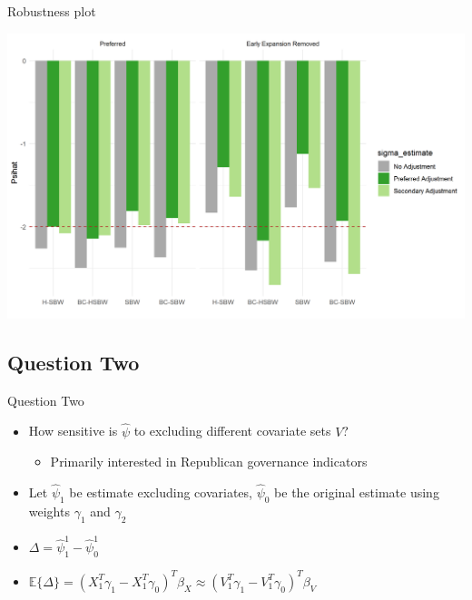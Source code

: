 \documentclass[hyperref={pdfpagelabels=false}]{beamer}
\begin{document}
\begin{frame}{Robustness plot}

\begin{center}
	\includegraphics[scale=0.5]{01_Plots/all-estimates-c1c2.png}
\end{center}
\end{frame}

\subsection{Question Two}

\begin{frame}{Question Two}
    \begin{itemize}
        \item How sensitive is $\hat{\psi}$ to excluding different covariate sets $V$? \bigskip 
        \begin{itemize}
            \item Primarily interested in Republican governance indicators \bigskip
        \end{itemize}
        \item Let $\hat{\psi}_1$ be estimate excluding covariates, $\hat{\psi}_0$ be the original estimate using weights $\gamma_1$ and $\gamma_2$ \bigskip
        \item $\Delta = \hat{\psi}^1_1 - \hat{\psi}^1_0$ \bigskip
        \item $\mathbb{E}\{\Delta\} = (X_1^T\gamma_1 - X_1^T\gamma_0)^T\beta_X \approx (V_1^T\gamma_1 - V_1^T\gamma_0)^T\beta_V$
    \end{itemize}
\end{frame}
\end{document}

